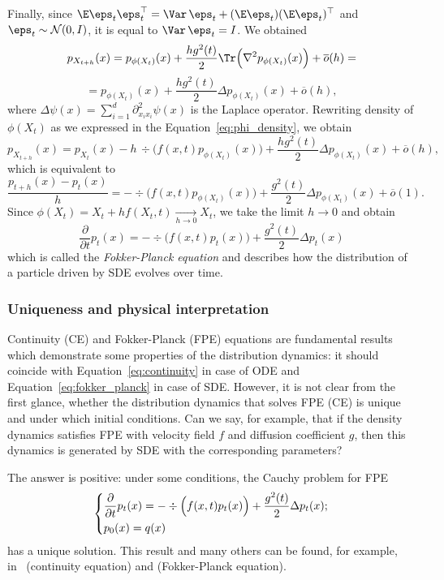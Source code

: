 Finally, since $\E \eps_t \eps_t^\top = \Var \,\eps_t + (\E \eps_t )(\E \eps_t)^\top$ and $\eps_t \sim \mathcal{N}(0, I)$, it is equal to $\Var \, \eps_t = I$. We obtained
\[
    p_{X_{t + h}}(x) = p_{\phi(X_t)}(x) + \frac{h g^2(t)}{2} \Tr\Big(\nabla^2 p_{\phi(X_t)}(x)\Big) + \overline{o}(h) =
\]
\[
    = p_{\phi(X_t)}(x) + \frac{h g^2(t)}{2} \Delta p_{\phi(X_t)}(x) + \overline{o}(h),
\]
where $\Delta \psi(x) = \sum_{i = 1}^{d} \partial^2_{x_i x_i} \psi(x)$ is the Laplace operator. Rewriting density of $\phi(X_t)$ as we expressed in the Equation~\ref{eq:phi_density}, we obtain
\[
    p_{X_{t + h}}(x) = p_{X_t}(x) - h \, \div\Big(f(x, t) p_{\phi(X_t)}(x)\Big) + \frac{h g^2(t)}{2} \Delta p_{\phi(X_t)}(x) +  \overline{o}(h),
\]
which is equivalent to
\[
    \frac{p_{t + h}(x) - p_{t}(x)}{h} = -\div \Big(f(x, t) p_{\phi(X_t)}(x) \Big) + \frac{g^2(t)}{2} \Delta p_{\phi(X_t)}(x) + \overline{o}(1).
\]
Since $\phi(X_t) = X_t + h f(X_t, t) \xrightarrow[h \rightarrow 0]{} X_t$, we take the limit $h \rightarrow 0$ and obtain
\begin{equation}\label{eq:fokker_planck}
    \boxed{\frac{\partial}{\partial t} p_t(x) = -\div \Big(f(x, t) p_{t}(x)\Big) + \frac{g^2(t)}{2} \Delta p_t(x)}
\end{equation}
which is called the \emph{Fokker-Planck equation} and describes how the distribution of a particle driven by SDE evolves over time.

\subsubsection{Uniqueness and physical interpretation}
\label{sec:fpe_unique}
Continuity (CE) and Fokker-Planck (FPE) equations are fundamental results which demonstrate some properties of the distribution dynamics: it should coincide with Equation~\ref{eq:continuity} in case of ODE and Equation~\ref{eq:fokker_planck} in case of SDE. However, it is not clear from the first glance, whether the distribution dynamics that solves FPE (CE) is unique and under which initial conditions. Can we say, for example, that if the density dynamics satisfies FPE with velocity field $f$ and diffusion coefficient $g$, then this dynamics is generated by SDE with the corresponding parameters?

The answer is positive: under some conditions, the Cauchy problem for FPE
\begin{equation}\label{eq:cauchy_fpe}
    \begin{dcases}
        \frac{\partial}{\partial t} p_t(x) = -\div\Big(f(x, t)p_t(x)\Big) + \frac{g^2(t)}{2} \Delta p_t(x);\\
        p_0(x) = q(x)
    \end{dcases}
\end{equation}
has a unique solution. This result and many others can be found, for example, in~\cite{ambrosio2005gradient} (continuity equation) and \cite{bogachev2021uniqueness, bogachev2022fokker} (Fokker-Planck equation).

